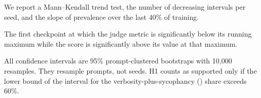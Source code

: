 We report a Mann--Kendall trend test, the number of decreasing intervals per seed, and the slope of prevalence over the last 40\% of training.

The first checkpoint at which the judge metric is significantly below its running maximum while the \rmodel score is significantly above its value at that maximum.

All confidence intervals are 95\% prompt-clustered bootstraps with 10,000 resamples.
They resample prompts, not seeds.
H1 counts as supported only if the lower bound of the interval for the verbosity-plus-sycophancy (\vsshare) share exceeds 60\%.

